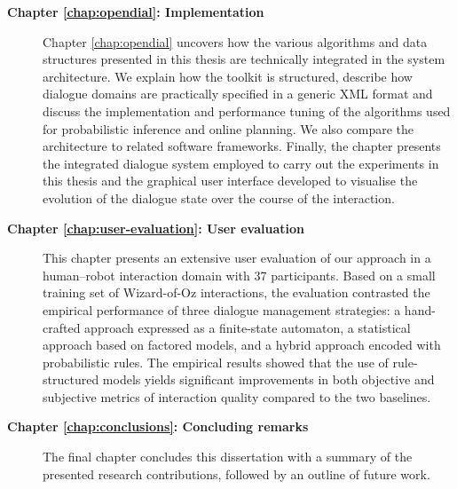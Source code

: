 \begin{description}
\item [\textbf{Chapter \ref{chap:opendial}: Implementation}] \hfill  \vspace{2mm}

Chapter \ref{chap:opendial} uncovers how the various algorithms and data structures presented in this thesis are technically integrated in the system architecture.  We explain how the \opendial{} toolkit is structured, describe how dialogue domains are practically specified in a generic XML format and discuss the implementation and performance tuning of the algorithms used for probabilistic inference and online planning.  We also compare the \opendial{} architecture to related software frameworks.  Finally, the chapter presents the integrated dialogue system employed to carry out the experiments in this thesis and the graphical user interface developed to visualise the evolution of the dialogue state over the course of the interaction. 

\item [\textbf{Chapter \ref{chap:user-evaluation}: User evaluation}] \hfill  \vspace{2mm}

This chapter presents an extensive user evaluation of our approach in a human--robot interaction domain with 37 participants.  Based on a small training set of Wizard-of-Oz interactions, the evaluation contrasted the empirical performance of three dialogue management strategies: a hand-crafted approach expressed as a finite-state automaton, a statistical approach based on factored models, and a hybrid approach encoded with probabilistic rules.  The empirical results showed that the use of rule-structured models yields significant improvements in both objective and subjective metrics of interaction quality compared to the two baselines. \vspace{2mm}


\item [\textbf{Chapter \ref{chap:conclusions}: Concluding remarks}] \hfill  \vspace{2mm}

The final chapter concludes this dissertation with a summary of the presented research contributions, followed by an outline of future work.   \vspace{2mm}

\end{description}


